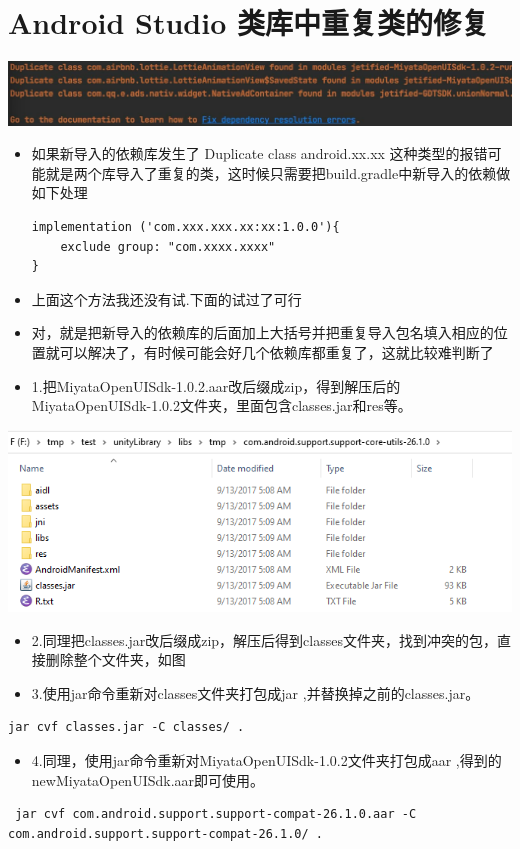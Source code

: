 \documentclass[9pt, b5paper]{article}
\begin{document}
\section{Android Studio 类库中重复类的修复}
\label{sec-6}

\includegraphics[width=.9\linewidth]{./pic/unityToAndroid_20221124_221720.png}
\begin{itemize}
\item 如果新导入的依赖库发生了 Duplicate class android.xx.xx 这种类型的报错可能就是两个库导入了重复的类，这时候只需要把build.gradle中新导入的依赖做如下处理
\begin{verbatim}
implementation ('com.xxx.xxx.xx:xx:1.0.0'){
    exclude group: "com.xxxx.xxxx"
}
\end{verbatim}
\item 上面这个方法我还没有试.下面的试过了可行
\item 对，就是把新导入的依赖库的后面加上大括号并把重复导入包名填入相应的位置就可以解决了，有时候可能会好几个依赖库都重复了，这就比较难判断了
\item 1.把MiyataOpenUISdk-1.0.2.aar改后缀成zip，得到解压后的MiyataOpenUISdk-1.0.2文件夹，里面包含classes.jar和res等。
\end{itemize}

\includegraphics[width=.9\linewidth]{./pic/unityToAndroid_20221124_221954.png}
\begin{itemize}
\item 2.同理把classes.jar改后缀成zip，解压后得到classes文件夹，找到冲突的包，直接删除整个文件夹，如图
\item 3.使用jar命令重新对classes文件夹打包成jar ,并替换掉之前的classes.jar。
\end{itemize}
\begin{verbatim}
jar cvf classes.jar -C classes/ .
\end{verbatim}
\begin{itemize}
\item 4.同理，使用jar命令重新对MiyataOpenUISdk-1.0.2文件夹打包成aar ,得到的newMiyataOpenUISdk.aar即可使用。
\end{itemize}
\begin{verbatim}
 jar cvf com.android.support.support-compat-26.1.0.aar -C com.android.support.support-compat-26.1.0/ .
\end{verbatim}
\end{document}
